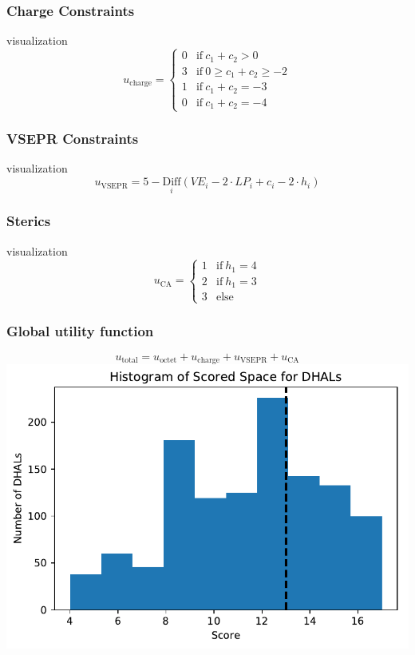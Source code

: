 \documentclass[xcolor=dvipsnames]{beamer}
\begin{document}
\begin{frame}
\frametitle{Charge Constraints}
visualization
\begin{equation}
u_{\textrm{charge}} = 
\begin{cases}
0	&	\mathrm{if}~ c_1 + c_2 > 0 \\
3	&	\mathrm{if}~ 0 \geq c_1 + c_2 \geq -2 \\
1   &	\mathrm{if}~ c_1 + c_2 = -3 \\
0   &	\mathrm{if}~ c_1 + c_2 = -4 
\end{cases}
\end{equation}
\end{frame}

\begin{frame}
\frametitle{VSEPR Constraints}
visualization
\begin{equation}
u_{\textrm{VSEPR}} = 
 5- \underset{i}{\textrm{Diff}} \left( VE_i - 2 \cdot LP_i + c_i - 2 \cdot h_i \right)
\end{equation}
\end{frame}


\begin{frame}
\frametitle{Sterics}
visualization
\begin{equation}
u_{\textrm{CA}} = 
\begin{cases}
1	&	\mathrm{if}~ h_1 = 4 \\
2	&	\mathrm{if}~ h_1 = 3 \\
3   &	\textrm{else} 
\end{cases}
\end{equation}
\end{frame}

\begin{frame}
\frametitle{Global utility function}
\begin{equation}
u_{\textrm{total}} = u_{\textrm{octet}} + u_{\textrm{charge}} + u_{\textrm{VSEPR}} + u_{\textrm{CA}}
\end{equation}
\includegraphics[width=0.65\linewidth]{img/dhal_ss_hist.pdf} 
\centering
\end{frame}
\end{document}
